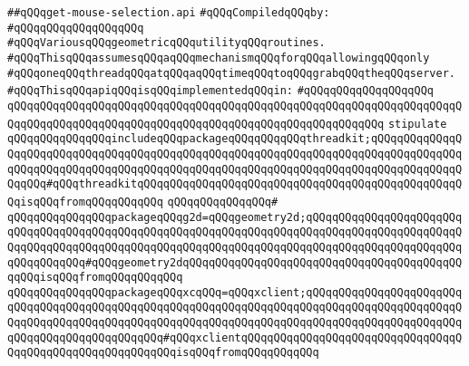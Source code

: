 \label{src/lib/x-kit/widget/old/fancy/graphviz/get-mouse-selection.api}
\verb|##qQQqget-mouse-selection.api|\newline
\newline
\verb|#qQQqCompiledqQQqby:|\newline
\verb|#qQQqqQQqqQQqqQQqqQQq|\newline
\newline
\verb|#qQQqVariousqQQqgeometricqQQqutilityqQQqroutines.|\newline
\verb|#qQQqThisqQQqassumesqQQqaqQQqmechanismqQQqforqQQqallowingqQQqonly|\newline
\verb|#qQQqoneqQQqthreadqQQqatqQQqaqQQqtimeqQQqtoqQQqgrabqQQqtheqQQqserver.|\newline
\newline
\newline
\verb|#qQQqThisqQQqapiqQQqisqQQqimplementedqQQqin:|\newline
\verb|#qQQqqQQqqQQqqQQqqQQq|\newline
\newline
\verb|qQQqqQQqqQQqqQQqqQQqqQQqqQQqqQQqqQQqqQQqqQQqqQQqqQQqqQQqqQQqqQQqqQQqqQQqqQQqqQQqqQQqqQQqqQQqqQQqqQQqqQQqqQQqqQQqqQQqqQQqqQQqqQQq|\newline
\verb|stipulate|\newline
\verb|qQQqqQQqqQQqqQQqincludeqQQqpackageqQQqqQQqqQQqthreadkit;qQQqqQQqqQQqqQQqqQQqqQQqqQQqqQQqqQQqqQQqqQQqqQQqqQQqqQQqqQQqqQQqqQQqqQQqqQQqqQQqqQQqqQQqqQQqqQQqqQQqqQQqqQQqqQQqqQQqqQQqqQQqqQQqqQQqqQQqqQQqqQQqqQQqqQQqqQQqqQQq#qQQqthreadkitqQQqqQQqqQQqqQQqqQQqqQQqqQQqqQQqqQQqqQQqqQQqqQQqqQQqisqQQqfromqQQqqQQqqQQq|\newline
\verb|qQQqqQQqqQQqqQQq#|\newline
\verb|qQQqqQQqqQQqqQQqpackageqQQqg2d=qQQqgeometry2d;qQQqqQQqqQQqqQQqqQQqqQQqqQQqqQQqqQQqqQQqqQQqqQQqqQQqqQQqqQQqqQQqqQQqqQQqqQQqqQQqqQQqqQQqqQQqqQQqqQQqqQQqqQQqqQQqqQQqqQQqqQQqqQQqqQQqqQQqqQQqqQQqqQQqqQQqqQQqqQQqqQQqqQQqqQQqqQQq#qQQqgeometry2dqQQqqQQqqQQqqQQqqQQqqQQqqQQqqQQqqQQqqQQqqQQqqQQqisqQQqfromqQQqqQQqqQQq|\newline
\verb|qQQqqQQqqQQqqQQqpackageqQQqxcqQQq=qQQqxclient;qQQqqQQqqQQqqQQqqQQqqQQqqQQqqQQqqQQqqQQqqQQqqQQqqQQqqQQqqQQqqQQqqQQqqQQqqQQqqQQqqQQqqQQqqQQqqQQqqQQqqQQqqQQqqQQqqQQqqQQqqQQqqQQqqQQqqQQqqQQqqQQqqQQqqQQqqQQqqQQqqQQqqQQqqQQqqQQqqQQqqQQqqQQq#qQQqxclientqQQqqQQqqQQqqQQqqQQqqQQqqQQqqQQqqQQqqQQqqQQqqQQqqQQqqQQqqQQqisqQQqfromqQQqqQQqqQQq|\newline
